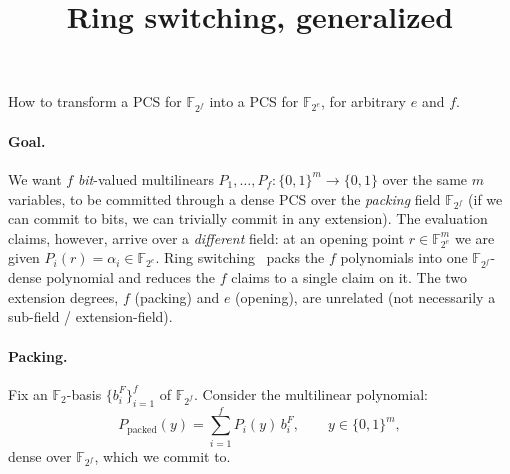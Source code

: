 \documentclass[11pt]{article}
\title{\textbf{Ring switching, generalized}}
\author{}
\date{}
\newcommand{\F}{\mathbb{F}}
\newcommand{\pkd}{\mathrm{packed}}
\begin{document}
\maketitle
\vspace{-3em}
\begin{center}
How to transform a PCS for $\F_{2^f}$ into a PCS for $\F_{2^e}$, for arbitrary $e$ and $f$.
\end{center}

\paragraph{Goal.} We want $f$ \emph{bit}-valued multilinears $P_1,\dots,P_f:\{0,1\}^m\to\{0,1\}$ over the same $m$ variables, to be committed through a dense PCS over the \emph{packing} field $\F_{2^f}$ (if we can commit to bits, we can trivially commit in any extension). The evaluation claims, however, arrive over a \emph{different} field: at an opening point $r\in\F_{2^e}^m$ we are given $P_i(r)=\alpha_i\in\F_{2^e}$. Ring switching~\cite{DP26} packs the $f$ polynomials into one $\F_{2^f}$-dense polynomial and reduces the $f$ claims to a single claim on it. The two extension degrees, $f$ (packing) and $e$ (opening), are unrelated (not necessarily a sub-field / extension-field).

\paragraph{Packing.} Fix an $\F_2$-basis $\{b^{F}_i\}_{i=1}^f$ of $\F_{2^f}$. Consider the multilinear polynomial:
\[
P_\pkd(y)=\sum_{i=1}^f P_i(y)\,b^{F}_i,\qquad y\in\{0,1\}^m,
\]
dense over $\F_{2^f}$, which we commit to.
\end{document}
